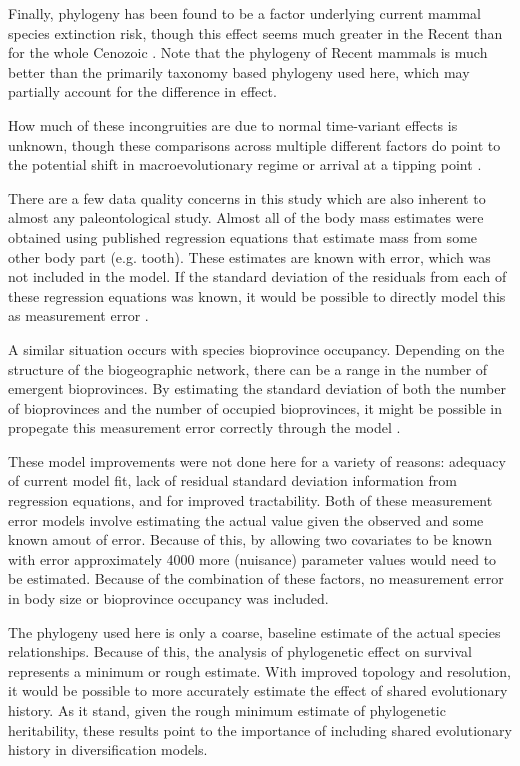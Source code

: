 \documentclass[12pt,letterpaper]{article}
\begin{document}
Finally, phylogeny has been found to be a factor underlying current mammal species extinction risk, though this effect seems much greater in the Recent than for the whole Cenozoic \citep{Fritz2010b}. Note that the phylogeny of Recent mammals is much better than the primarily taxonomy based phylogeny used here, which may partially account for the difference in effect.

How much of these incongruities are due to normal time-variant effects is unknown, though these comparisons across multiple different factors do point to the potential shift in macroevolutionary regime \citep{Jablonski1986} or arrival at a tipping point \citep{Barnosky2012a,Barnosky2011}.


There are a few data quality concerns in this study which are also inherent to almost any paleontological study. Almost all of the body mass estimates were obtained using published regression equations that estimate mass from some other body part (e.g. tooth). These estimates are known with error, which was not included in the model. If the standard deviation of the residuals from each of these regression equations was known, it would be possible to directly model this as measurement error \citep{Gelman2013d}. 

A similar situation occurs with species bioprovince occupancy. Depending on the structure of the biogeographic network, there can be a range in the number of emergent bioprovinces. By estimating the standard deviation of both the number of bioprovinces and the number of occupied bioprovinces, it might be possible in propegate this measurement error correctly through the model \citep{Gelman2013d}. 

These model improvements were not done here for a variety of reasons: adequacy of current model fit, lack of residual standard deviation information from regression equations, and for improved tractability. Both of these measurement error models involve estimating the actual value given the observed and some known amout of error. Because of this, by allowing two covariates to be known with error approximately 4000 more (nuisance) parameter values would need to be estimated. Because of the combination of these factors, no measurement error in body size or bioprovince occupancy was included.

The phylogeny used here is only a coarse, baseline estimate of the actual species relationships. Because of this, the analysis of phylogenetic effect on survival represents a minimum or rough estimate. With improved topology and resolution, it would be possible to more accurately estimate the effect of shared evolutionary history. As it stand, given the rough minimum estimate of phylogenetic heritability, these results point to the importance of including shared evolutionary history in diversification models.
\end{document}
